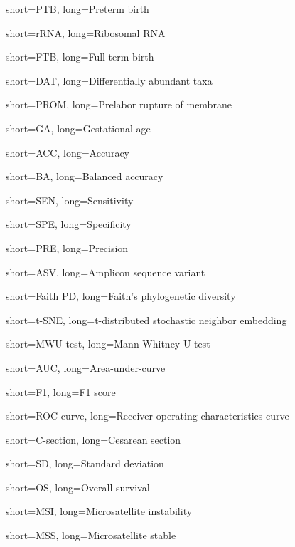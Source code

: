 {
    short=PTB,
    long=Preterm birth
}

{
    short=rRNA,
    long=Ribosomal RNA
}

{
    short=FTB,
    long=Full-term birth
}

{
    short=DAT,
    long=Differentially abundant taxa
}

{
    short=PROM,
    long=Prelabor rupture of membrane
}

{
    short=GA,
    long=Gestational age
}

{
    short=ACC,
    long=Accuracy
}

{
    short=BA,
    long=Balanced accuracy
}

{
    short=SEN,
    long=Sensitivity
}

{
    short=SPE,
    long=Specificity
}

{
    short=PRE,
    long=Precision
}

{
    short=ASV,
    long=Amplicon sequence variant
}

{
    short=Faith PD,
    long=Faith's phylogenetic diversity
}

{
    short=t-SNE,
    long=t-distributed stochastic neighbor embedding
}

{
    short=MWU test,
    long=Mann-Whitney U-test
}

{
    short=AUC,
    long=Area-under-curve 
}

{
    short=F1,
    long=F1 score
}

{
    short=ROC curve,
    long=Receiver-operating characteristics curve
}

{
    short=C-section,
    long=Cesarean section
}

{
    short=SD,
    long=Standard deviation
}

{
    short=OS,
    long=Overall survival
}

{
    short=MSI,
    long=Microsatellite instability
}

{
    short=MSS,
    long=Microsatellite stable
}

